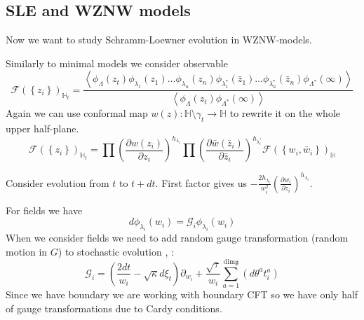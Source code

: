 \documentclass[12pt]{article}
\theoremstyle{definition}
\newcommand{\gf}{\mathfrak{g}}
\theoremstyle{definition} \newtheorem{Def}{Definition}
\begin{document}
\subsection{SLE and WZNW models}
Now we want to study Schramm-Loewner evolution in WZNW-models.

Similarly to minimal models we consider observable
\begin{equation*}
  \mathcal{F}(\left\{z_{i}\right\})_{\mathbb{H}_{t}}=
  \frac{\left<\phi_{\Lambda}(z_{t}) \phi_{\lambda_1}(z_{1}) \dots \phi_{\lambda_n}(z_{n}) \phi_{\lambda^{*}_1}(\bar z_{1}) \dots \phi_{\lambda^{*}_n}(\bar z_{n})
      \phi_{\Lambda^{*}}(\infty)\right>}{\left<\phi_{\Lambda}(z_{t})\phi_{\Lambda^{*}}(\infty)\right>}
\end{equation*}
Again we can use conformal map  $w(z):\mathbb{H}\setminus\gamma_{t}\to \mathbb{H}$ to rewrite it on the whole upper half-plane. 
\begin{equation*}
  \mathcal{F}(\left\{z_{i}\right\})_{\mathbb{H}_{t}}=\prod \left(\frac{\partial w(z_{i})}{\partial z_{i}}\right)^{h_{\lambda_i}} 
  \prod \left(\frac{\partial \bar w(\bar z_{i})}{\partial \bar z_{i}}\right)^{h_{\lambda^{*}_i}}
  \mathcal{F}(\left\{w_{i}, \bar w_{i}\right\})_{\mathbb{H}}
\end{equation*}

Consider evolution from $t$ to $t+dt$.
First factor gives us $-\frac{2h_{\lambda_{i}}}{w_{i}^{2}}\left(\frac{\partial w_{i}}{\partial z_{i}}\right)^{h_{\lambda_{i}}}$.

 For fields we have
\begin{equation*}
  d\phi_{\lambda_{i}}(w_{i}) = \mathcal{G}_{i}\phi_{\lambda_{i}}(w_{i})
\end{equation*}
When we consider fields we need to add random gauge transformation (random motion in $G$) to stochastic evolution \cite{bettelheim2005stochastic}, \cite{alekseev2010sle}:
\begin{equation*}
  \mathcal{G}_{i}=\left(\frac{2dt}{w_{i}}-\sqrt{\kappa} d\xi_{t}\right) \partial_{w_{i}}+\frac{\sqrt{\tau}}{w_{i}}\sum_{a=1}^{\mathrm{dim} \gf}\left(d \theta ^{a} t^{a}_{i}\right)
\end{equation*}
Since we have boundary we are working with boundary CFT so we have only half of gauge transformations due to Cardy conditions.
\end{document}
